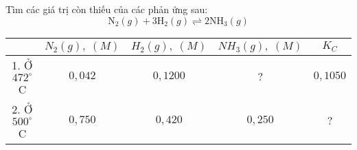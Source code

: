 \begin{bt}
	Tìm các giá trị còn thiếu của các phản ứng sau:
	\[
	\mathrm{N}_2(g) + 3\mathrm{H}_2(g) \rightleftharpoons 2\mathrm{NH}_3(g)
	\]
	\begin{center}
		\begin{tabular}{|c|c|c|c|c|}
		\hline
		&$N_2(g),\;(M)$&$H_2(g),\;(M)$&$NH_3(g),\;(M)$&$K_C$\\
		\hline
		1. Ở $472^\circ$C &$0{,}042$&$0{,}1200$&$?$&$0{,}1050$\\
		\hline
		2. Ở $500^\circ$C &$0{,}750$&$0{,}420$&$0{,}250$&$?$\\
		\hline
		\end{tabular}
	\end{center}
\end{bt}

